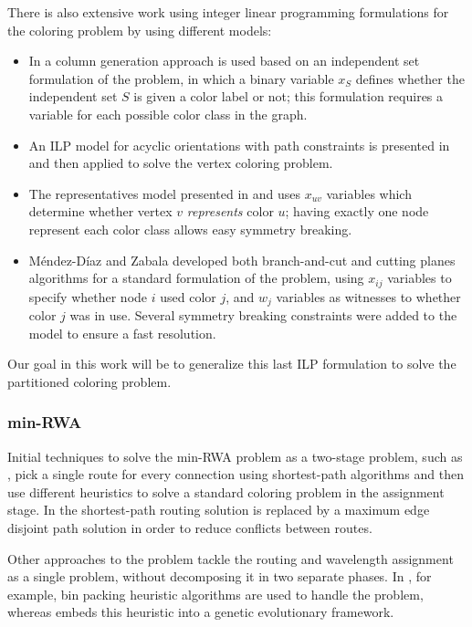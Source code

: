 There is also extensive work using integer linear programming formulations for the coloring problem by using different models:
\begin{itemize}
\item{In \cite{mehrotra1996column} a column generation approach is used based on an independent set formulation of the problem, in which a binary variable $x_S$ defines whether the independent set $S$ is given a color label or not; this formulation requires a variable for each possible color class in the graph.}
\item{An ILP model for acyclic orientations with path constraints is presented in \cite{figueiredo2005acyclic} and then applied to solve the vertex coloring problem.}
\item{The representatives model presented in \cite{campelo2004cliques} and \cite{campelo2008asymmetric} uses $x_{uv}$ variables which determine whether vertex $v$ \textit{represents} color $u$; having exactly one node represent each color class allows easy symmetry breaking.}
\item{M\'endez-D\'iaz and Zabala \cite{mendez2006branch,mendez2008cutting} developed both branch-and-cut and cutting planes algorithms for a standard formulation of the problem, using $x_{ij}$ variables to specify whether node $i$ used color $j$, and $w_j$ variables as witnesses to whether color $j$ was in use. Several symmetry breaking constraints were added to the model to ensure a fast resolution.}
\end{itemize}

Our goal in this work will be to generalize this last ILP formulation to solve the partitioned coloring problem.

\subsubsection*{min-RWA}

Initial techniques to solve the min-RWA problem as a two-stage problem, such as \cite{hyytia14wavelength}, pick a single route for every connection using shortest-path algorithms and then use different heuristics to solve a standard coloring problem in the assignment stage. In \cite{manohar2002routing} the shortest-path routing solution is replaced by a maximum edge disjoint path solution in order to reduce conflicts between routes.

Other approaches to the problem tackle the routing and wavelength assignment as a single problem, without decomposing it in two separate phases. In \cite{skorin2007routing}, for example, bin packing heuristic algorithms are used to handle the problem, whereas \cite{noronha2007random} embeds this heuristic into a genetic evolutionary framework.

